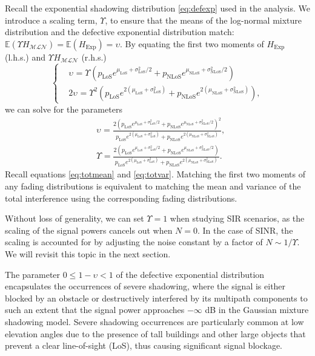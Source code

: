 \documentclass[lettersize,journal]{IEEEtran}
\begin{document}
Recall the exponential shadowing distribution \eqref{eq:defexp} used in the analysis. We introduce a scaling term, $\Upsilon$, to ensure that the means of the log-normal mixture distribution and the defective exponential distribution match: $\mathbb{E}(\Upsilon H_{\mathcal{MLN}}) = \mathbb{E}(H_{\text{Exp}}) = \upsilon$. By equating the first two moments of $H_{\text{Exp}}$ (l.h.s.) and $\Upsilon_{} H_{\mathcal{M} \mathcal{L}\mathcal{N}}$ (r.h.s.)
\begin{equation}
  \label{eq:matchingmoments}
  \begin{cases}
    &\upsilon_{} = \Upsilon_{} \left(p_{\text{LoS}} e^{\mu_{\text{LoS}} + \sigma_{\text{LoS}}^2/2} + p_{\text{NLoS}} e^{\mu_{\text{NLoS}} + \sigma_{\text{NLoS}}^2/2}\right)\\
    &2\upsilon_{}= \Upsilon_{}^2 \left( p_{\text{LoS}} e^{2(\mu_{\text{LoS}} + \sigma_{\text{LoS}}^2)} + p_{\text{NLoS}} e^{2(\mu_{\text{NLoS}} + \sigma_{\text{NLoS}}^2)} \right), 
  \end{cases}
\end{equation}
 we can solve for the parameters
\begin{align}
  \label{eq:upsilon}
  & \upsilon_{}= \frac{ 2\left( p_{\text{LoS}}e^{\mu_{\text{LoS}}+\sigma^2_{\text{LoS}}/2}+p_{\text{NLoS}}e^{\mu_{\text{NLoS}}+\sigma^2_{\text{NLoS}}/2} \right)^2}{p_{\text{LoS}}e^{2(\mu_{\text{LoS}}+\sigma_{\text{LoS}}^2)}+p_{\text{NLoS}}e^{2(\mu_{\text{NLoS}}+\sigma_{\text{NLoS}}^2)}}, \\
    \label{eq:Upsilon}
    &\Upsilon_{} = \frac{2\left(p_{\text{LoS}}e^{\mu_{\text{LoS}}+\sigma^2_{\text{LoS}}/2}+p_{\text{NLoS}}e^{\mu_{\text{NLoS}}+\sigma^2_{\text{NLoS}}/2}\right)}{p_{\text{LoS}}e^{2(\mu_{\text{LoS}}+\sigma_{\text{LoS}}^2)}+p_{\text{NLoS}}e^{2(\mu_{\text{NLoS}}+\sigma_{\text{NLoS}}^2)}}.
\end{align}
Recall equations \eqref{eq:totmean} and \eqref{eq:totvar}. Matching the first two moments of any fading distributions is equivalent to matching the mean and variance of the total interference using the corresponding fading distributions.


Without loss of generality, we can set $\Upsilon = 1$ when studying SIR scenarios, as the scaling of the signal powers cancels out when $N = 0$. In the case of SINR, the scaling is accounted for by adjusting the noise constant by a factor of $N \sim 1/\Upsilon$. We will revisit this topic in the next section.

The parameter $0 \leq 1-\upsilon < 1$ of the defective exponential distribution encapsulates the occurrences of severe shadowing, where the signal is either blocked by an obstacle or destructively interfered by its multipath components to such an extent that the signal power approaches $-\infty$ dB in the Gaussian mixture shadowing model. Severe shadowing occurrences are particularly common at low elevation angles due to the presence of tall buildings and other large objects that prevent a clear line-of-sight (LoS), thus causing significant signal blockage.
\end{document}
